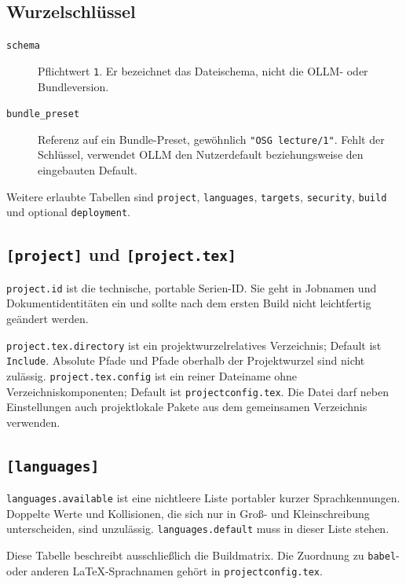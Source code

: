\documentclass[
load-preamble+
]{osgdoc}
\begin{document}
\subsection{Wurzelschlüssel}

\begin{description}
\item[\texttt{schema}] Pflichtwert \texttt{1}. Er bezeichnet das
  Dateischema, nicht die OLLM- oder Bundleversion.
\item[\texttt{bundle\_preset}] Referenz auf ein Bundle-Preset, gewöhnlich
  \verb|"OSG lecture/1"|. Fehlt der Schlüssel, verwendet OLLM den
  Nutzerdefault beziehungsweise den eingebauten Default.
\end{description}

Weitere erlaubte Tabellen sind \texttt{project}, \texttt{languages},
\texttt{targets}, \texttt{security}, \texttt{build} und optional
\texttt{deployment}.

\subsection{\texttt{[project]} und \texttt{[project.tex]}}

\verb|project.id| ist die technische, portable Serien-ID. Sie geht in
Jobnamen und Dokumentidentitäten ein und sollte nach dem ersten Build nicht
leichtfertig geändert werden.

\verb|project.tex.directory| ist ein projektwurzelrelatives Verzeichnis;
Default ist \texttt{Include}. Absolute Pfade und Pfade oberhalb der
Projektwurzel sind nicht zulässig. \verb|project.tex.config| ist ein reiner
Dateiname ohne Verzeichniskomponenten; Default ist
\texttt{projectconfig.tex}. Die Datei darf neben Einstellungen auch
projektlokale Pakete aus dem gemeinsamen Verzeichnis verwenden.

\subsection{\texttt{[languages]}}

\verb|languages.available| ist eine nichtleere Liste portabler kurzer
Sprachkennungen. Doppelte Werte und Kollisionen, die sich nur in Groß- und
Kleinschreibung unterscheiden, sind unzulässig. \verb|languages.default|
muss in dieser Liste stehen.

Diese Tabelle beschreibt ausschließlich die Buildmatrix. Die Zuordnung zu
\texttt{babel}- oder anderen LaTeX-Sprachnamen gehört in
\texttt{projectconfig.tex}.
\end{document}
